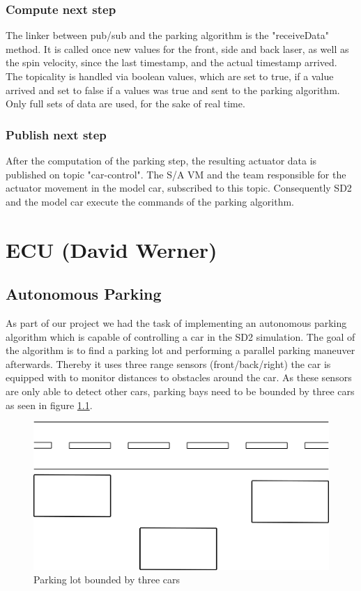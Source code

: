 \documentclass[paper=a4, fontsize=11pt]{scrreprt}
\begin{document}
  \subsection{Compute next step}
The linker between pub/sub and the parking algorithm is the "receiveData" method. It is called once new values for the front, side and back laser, as well as the spin velocity, since the last timestamp, and the actual timestamp arrived. The topicality is handled via boolean values, which are set to true, if a value arrived and set to false if a values was true and sent to the parking algorithm. Only full sets of data are used, for the sake of real time.
  \subsection{Publish next step}
After the computation of the parking step, the resulting actuator data is published on topic "car-control". The S/A VM and the team responsible for the actuator movement in the model car, subscribed to this topic. Consequently SD2 and the model car execute the commands of the parking algorithm.
\chapter{ECU (David Werner)}
\section{Autonomous Parking}
As part of our project we had the task of implementing an autonomous parking algorithm which is capable of controlling a car in the SD2 simulation. 
The goal of the algorithm is to find a parking lot and performing a parallel parking maneuver afterwards. Thereby it uses three range sensors (front/back/right) the car is equipped with to monitor distances to obstacles around the car. As these sensors are only able to detect other cars, parking bays need to be bounded by three cars as seen in figure \ref{parking_lot}.
\begin{figure}[H]
\centering
\includegraphics[scale=0.35]{images_ecu/parking_lot.png}
\caption{Parking lot bounded by three cars}
\label{parking_lot}
\end{figure}
\end{document}
